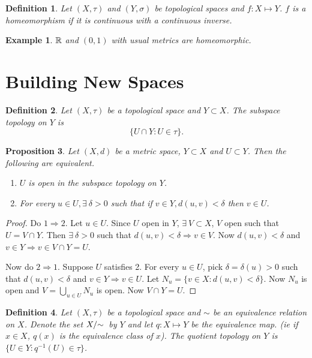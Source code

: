 \documentclass{notes}
\theoremstyle{plain}
\newtheorem{proposition}{Proposition}[chapter]
\newtheorem{definition}[proposition]{Definition}
\newtheorem*{example}{Example}
\newcommand{\quot}[1]{#1/\negthickspace\sim\,}
\begin{document}
\begin{definition}
  Let $(X,\tau)$ and $(Y,\sigma)$ be topological spaces and $f \colon
  X \mapsto Y$.
$f$ is a homeomorphism %
if it is continuous with a continuous inverse.
\end{definition}

\begin{example}
  $\mathbb{R}$ and $(0,1)$ with usual metrics are homeomorphic.
\end{example}

\section{Building New Spaces}

\begin{definition}
Let $(X,\tau)$ be a topological space and $Y \subset X$.  The subspace
topology on $Y$ is 
\[
\{ U \cap Y : U \in \tau \}.
\]
\end{definition}

\begin{proposition}
Let $(X,d)$ be a metric space, $Y \subset X$ and $U \subset Y$.  Then the
following are equivalent.
\begin{enumerate}
\item $U$ is open in the subspace topology on $Y$.
\item For every $u \in U, \exists\ \delta > 0$ such that if $v \in Y, d(u,v)
< \delta$ then $v \in U$.
\end{enumerate}
\end{proposition}

\begin{proof}
Do $1 \Rightarrow 2$.  Let $u \in U$.  Since $U$ open in $Y$, $\exists\ V
\subset X$, $V$ open such that $U = V \cap Y$.  Then $\exists\ \delta > 0$
such that $d(u,v) < \delta \Rightarrow v \in V$.  Now $d(u,v) < \delta$
and $v \in Y \Rightarrow v \in V \cap Y = U$.

Now do $2 \Rightarrow 1$.  Suppose $U$ satisfies 2.  For every $u \in U$,
pick $\delta = \delta(u) > 0$ such that $d(u,v) < \delta$ and $v \in Y
\Rightarrow v \in U$.  Let $N_u = \{v \in X : d(u,v) < \delta \}$.  Now
$N_u$ is open and $V = \bigcup_{u \in U} N_u$ is open.  Now $V \cap Y = U$.
\end{proof}

\begin{definition}
Let $(X,\tau)$ be a topological space and $\sim$ be an equivalence relation on
$X$.  Denote the set $\quot{X}$ by $Y$ and let $q \colon X \mapsto Y$ be the
equivalence map. (ie if $x \in X$, $q(x)$ is the equivalence class of $x$).
The quotient topology on $Y$ is
$\{ U \in Y : q^{-1}(U) \in \tau\}$.
\end{definition}
\end{document}
